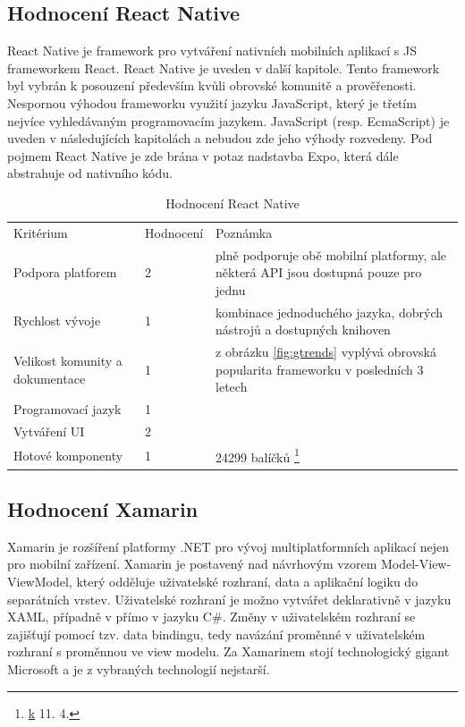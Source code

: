 \subsection{Hodnocení React Native}

React Native je framework pro vytváření nativních mobilních aplikací s JS frameworkem React. React Native je uveden v další kapitole. Tento framework byl vybrán k posouzení především kvůli obrovské komunitě a prověřenosti. Nespornou výhodou frameworku využití jazyku JavaScript, který je třetím nejvíce vyhledávaným programovacím jazykem. JavaScript (resp. EcmaScript) je uveden v následujících kapitolách a nebudou zde jeho výhody rozvedeny. Pod pojmem React Native je zde brána v potaz nadstavba Expo, která dále abstrahuje od nativního kódu.

\begin{table}[h]
	\begin{tabular}{lll}
		Kritérium                       & Hodnocení & Poznámka \\
		Podpora platforem  & 2  & plně podporuje obě mobilní platformy, ale některá API jsou dostupná pouze pro jednu \\
		Rychlost vývoje                 & 1 & kombinace jednoduchého jazyka, dobrých nástrojů a dostupných knihoven \\
		Velikost komunity a dokumentace & 1  & z obrázku  \ref{fig:gtrends}  vyplývá obrovská popularita frameworku v posledních 3 letech \\
		Programovací jazyk              & 1 &          \\
		Vytváření UI                    & 2 &          \\
		Hotové komponenty               & 1 & 24299 balíčků \footnote{\href{https://www.npmjs.com/search?q=react\%20native} k 11. 4.}   
	\end{tabular}
	\caption{Hodnocení React Native}
\end{table}

\subsection{Hodnocení Xamarin}


Xamarin je rozšíření platformy .NET pro vývoj multiplatformních aplikací nejen pro mobilní zařízení. Xamarin je postavený nad návrhovým vzorem Model-View-ViewModel, který odděluje uživatelské rozhraní, data a aplikační logiku do separátních vrstev. Uživatelské rozhraní je možno vytvářet deklarativně v jazyku XAML, případně v přímo v jazyku C\#. Změny v uživatelském rozhraní se zajišťují pomocí tzv. data bindingu, tedy navázání proměnné v uživatelském rozhraní s proměnnou ve view modelu. Za Xamarinem stojí technologický gigant Microsoft a je z vybraných technologií nejstarší.

